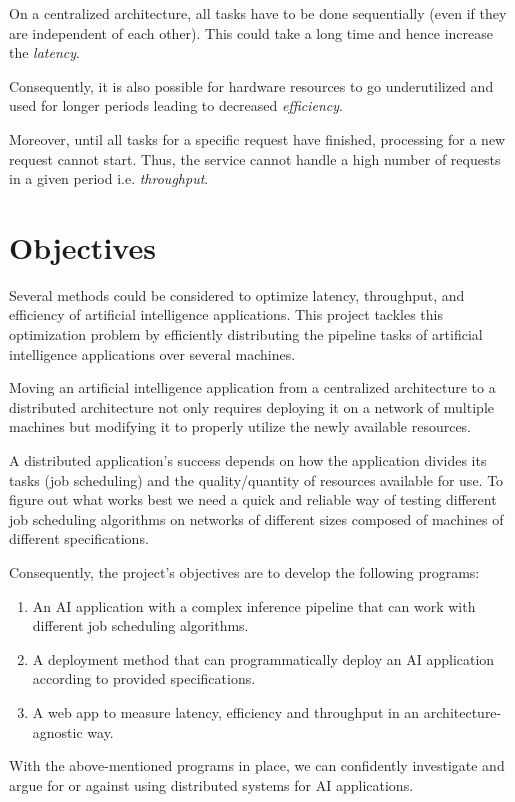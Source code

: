 \documentclass{report}
\begin{document}
On a centralized architecture, all tasks have to be done sequentially (even if they are independent of each other).
This could take a long time and hence increase the \textit{latency}.

Consequently, it is also possible for hardware resources to go underutilized and used for longer periods leading to decreased \textit{efficiency}.

Moreover, until all tasks for a specific request have finished, processing for a new request cannot start.
Thus, the service cannot handle a high number of requests in a given period i.e. \textit{throughput}.

\section{Objectives}\label{objectives}

Several methods could be considered to optimize latency, throughput, and efficiency of artificial intelligence applications.
This project tackles this optimization problem by efficiently distributing the pipeline tasks of artificial intelligence applications over several machines.

Moving an artificial intelligence application from a centralized architecture to a distributed architecture not only requires deploying it on a network of multiple machines but modifying it to properly utilize the newly available resources.

A distributed application's success depends on how the application divides its tasks (job scheduling) and the quality/quantity of resources available for use.
To figure out what works best we need a quick and reliable way of testing different job scheduling algorithms on networks of different sizes composed of machines of different specifications.

Consequently, the project's objectives are to develop the following programs:
\begin{enumerate}
  \item An AI application with a complex inference pipeline that can work with different job scheduling algorithms.
  \item A deployment method that can programmatically deploy an AI application according to provided specifications.
  \item A web app to measure latency, efficiency and throughput in an architecture-agnostic way.
\end{enumerate}

With the above-mentioned programs in place, we can confidently investigate and argue for or against using distributed systems for AI applications.
\end{document}
